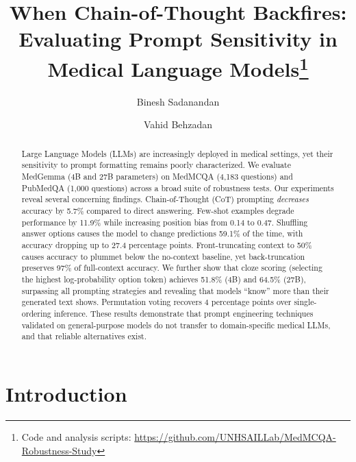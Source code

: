 \documentclass[runningheads,a4paper]{llncs}
\begin{document}
%
\title{When Chain-of-Thought Backfires:\\ Evaluating Prompt Sensitivity in Medical Language Models\thanks{Code and analysis scripts: \protect\url{https://github.com/UNHSAILLab/MedMCQA-Robustness-Study}}}
%
%
\author{Binesh Sadanandan \and
Vahid Behzadan}
%
%
%
\maketitle
%
\begin{abstract}
Large Language Models (LLMs) are increasingly deployed in medical settings, yet their sensitivity to prompt formatting remains poorly characterized. We evaluate MedGemma (4B and 27B parameters) on MedMCQA (4,183 questions) and PubMedQA (1,000 questions) across a broad suite of robustness tests. Our experiments reveal several concerning findings. Chain-of-Thought (CoT) prompting \textit{decreases} accuracy by 5.7\% compared to direct answering. Few-shot examples degrade performance by 11.9\% while increasing position bias from 0.14 to 0.47. Shuffling answer options causes the model to change predictions 59.1\% of the time, with accuracy dropping up to 27.4 percentage points. Front-truncating context to 50\% causes accuracy to plummet below the no-context baseline, yet back-truncation preserves 97\% of full-context accuracy. We further show that cloze scoring (selecting the highest log-probability option token) achieves 51.8\% (4B) and 64.5\% (27B), surpassing all prompting strategies and revealing that models ``know'' more than their generated text shows. Permutation voting recovers 4 percentage points over single-ordering inference. These results demonstrate that prompt engineering techniques validated on general-purpose models do not transfer to domain-specific medical LLMs, and that reliable alternatives exist.

\end{abstract}

\section{Introduction}
\end{document}
